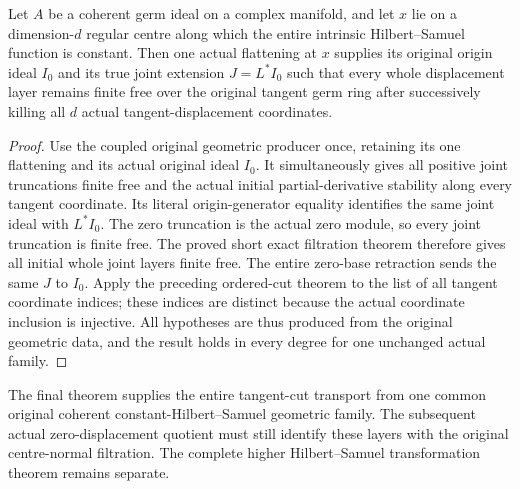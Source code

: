 \begin{theorem}
\label{hir:actual-original-joint-all-tangent-cuts-free}
\leanok
{}
Let $A$ be a coherent germ ideal on a complex manifold, and let $x$ lie
on a dimension-$d$ regular centre along which the entire intrinsic
Hilbert--Samuel function is constant. Then one actual flattening at
$x$ supplies its original origin ideal $I_0$ and its true joint
extension $J=L^*I_0$ such that every whole displacement layer remains
finite free over the original tangent germ ring after successively
killing all $d$ actual tangent-displacement coordinates.
\end{theorem}
\begin{proof}
Use the coupled original geometric producer once, retaining its one
flattening and its actual original ideal $I_0$. It simultaneously gives
all positive joint truncations finite free and the actual initial
partial-derivative stability along every tangent coordinate. Its literal
origin-generator equality identifies the same joint ideal with $L^*I_0$.
The zero truncation is the actual zero module, so every joint truncation
is finite free. The proved short exact filtration theorem therefore
gives all initial whole joint layers finite free. The entire zero-base
retraction sends the same $J$ to $I_0$. Apply the preceding ordered-cut
theorem to the list of all tangent coordinate indices; these indices
are distinct because the actual coordinate inclusion is injective.
All hypotheses are thus produced from the original geometric data, and
the result holds in every degree for one unchanged actual family.
\end{proof}

The final theorem supplies the entire tangent-cut transport from one
common original coherent constant-Hilbert--Samuel geometric family.
The subsequent actual zero-displacement quotient must still identify
these layers with the original centre-normal filtration. The complete
higher Hilbert--Samuel transformation theorem remains separate.
